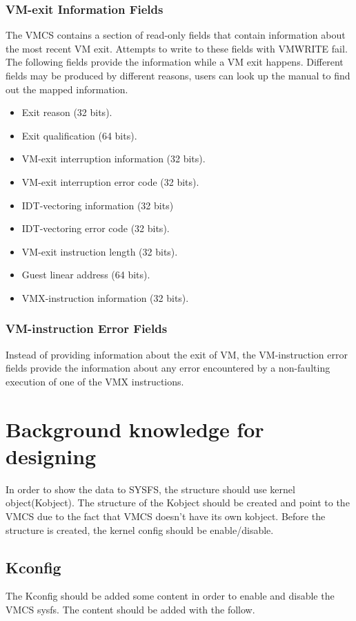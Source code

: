 \documentclass[10pt,draftclsnofoot,journal,compsoc,onecolumn]{IEEEtran}
\begin{document}
\subsubsection{VM-exit Information Fields}
	\par The VMCS contains a section of read-only fields that contain information about the most recent VM exit. Attempts to write to these fields with VMWRITE fail. The following fields provide the information while a VM exit happens. Different fields may be produced by different reasons, users can look up the manual to find out the mapped information.
\begin{itemize}
  \item Exit reason (32 bits).
  \item Exit qualification (64 bits).
  \item VM-exit interruption information (32 bits).
  \item VM-exit interruption error code (32 bits).
  \item IDT-vectoring information (32 bits)
  \item IDT-vectoring error code (32 bits).
  \item VM-exit instruction length (32 bits).
  \item Guest linear address (64 bits).
  \item VMX-instruction information (32 bits).
\end{itemize}
    
\subsubsection{VM-instruction Error Fields}
Instead of providing information about the exit of VM, the VM-instruction error fields provide the information about any error encountered by a non-faulting execution of one of the VMX instructions.

\section{Background knowledge for designing}
\par In order to show the data to SYSFS, the structure should use kernel object(Kobject). The structure of the Kobject should be created and point to the VMCS due to the fact that VMCS doesn’t have its own kobject. Before the structure is created, the kernel config should be enable/disable.

\subsection{Kconfig}
\par The Kconfig should be added some content in order to enable and disable the VMCS sysfs. The content should be added with the follow.
\end{document}
